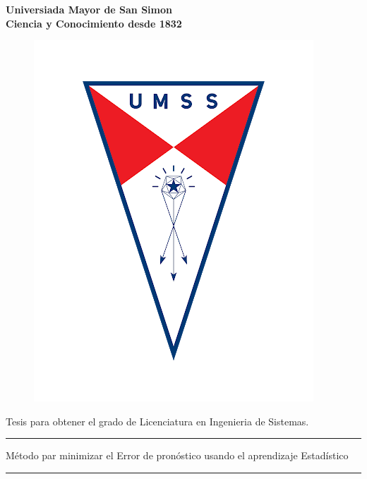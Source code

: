 \begin{titlepage}
	\begin{center}
		{\LARGE \textbf {Universiada Mayor de San Simon}}\\
		\vspace{0.25cm}
		{\large \textbf{Ciencia y Conocimiento desde 1832}}
		\vspace{0.25cm}
		\begin{figure}[h]
			\centering
			\includegraphics[scale=0.25]{imagenes/logo-umss.png}
		\end{figure}
	
		\vspace{1cm}
		
		{\large Tesis para obtener el grado de Licenciatura en Ingenieria de Sistemas.}
		
		\vspace{0.5cm}
		\rule{165mm}{0.5mm}
		\vspace{2mm}
		\begin{spacing}{1.5}
			{\large Método par minimizar el Error de pronóstico usando el aprendizaje Estadístico}
		\end{spacing}	
		\vspace{2mm}
		\rule{165mm}{0.5mm}
	\end{center}
\end{titlepage}